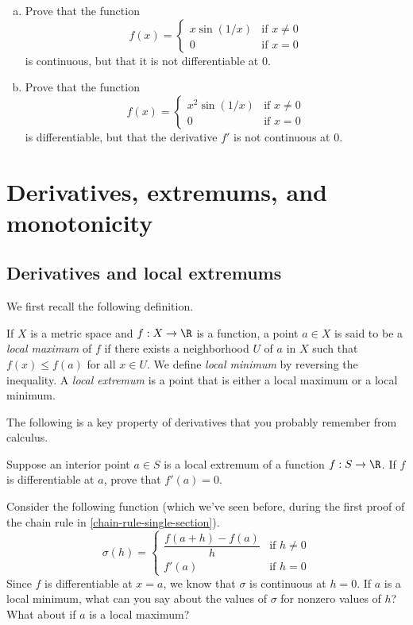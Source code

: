 \begin{exercise} \label{power-times-sine}
	\begin{enumerate}[(a)]
		\item Prove that the function \[ f(x) = \begin{cases} x\sin(1/x) & \text{if } x \neq 0 \\ 0 & \text{if } x = 0 \end{cases} \]
		is continuous, but that it is not differentiable at 0. 
		\item Prove that the function \[ f(x) = \begin{cases} x^2\sin(1/x) & \text{if } x \neq 0 \\ 0 & \text{if } x = 0 \end{cases} \]
		is differentiable, but that the derivative $f'$ is not continuous at 0.  
	\end{enumerate} 
\end{exercise}

\section{Derivatives, extremums, and monotonicity}

\subsection{Derivatives and local extremums}

We first recall the following definition. 

\begin{definition}
	If $X$ is a metric space and $f : X \to \R$ is a function, a point $a \in X$ is said to be a \emph{local maximum} of $f$ if there exists a neighborhood $U$ of $a$ in $X$ such that $f(x) \leq f(a)$ for all $x \in U$. We define \emph{local minimum} by reversing the inequality. A \emph{local extremum} is a point that is either a local maximum or a local minimum.
\end{definition}

The following is a key property of derivatives that you probably remember from calculus. 

\begin{exercise} \label{interior-extremum}
	Suppose an interior point $a \in S$ is a local extremum of a function $f : S \to \R$. If $f$ is differentiable at $a$, prove that $f'(a) = 0$.
	\begin{hint} Consider the following function (which we've seen before, during the first proof of the chain rule in \cref{chain-rule-single-section}).
	\[ \sigma(h) = \begin{cases} \dfrac{f(a+h)-f(a)}{h} & \text{if } h \neq 0 \\ f'(a) & \text{if } h = 0 \end{cases} \]
	Since $f$ is differentiable at $x = a$, we know that $\sigma$ is continuous at $h = 0$. If $a$ is a local minimum, what can you say about the values of $\sigma$ for nonzero values of $h$? What about if $a$ is a local maximum?
	\end{hint}
\end{exercise}

